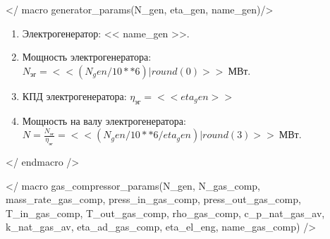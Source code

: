 

</ macro generator_params(N_gen, eta_gen, name_gen)/>
\begin{enumerate}
	\item Электрогенератор: << name_gen >>.
	\item Мощность электрогенератора: $N_{эг} = << (N_gen/10**6)|round(0) >>\ МВт$.
	\item КПД электрогенератора: $\eta_{эг} = << eta_gen >>$
	\item Мощность на валу электрогенератора: $N = \frac{N_{эг}}{\eta_{эг}} = << (N_gen / 10**6 / eta_gen)| round(3) >>\ МВт$.
\end{enumerate}
</ endmacro />


</ macro gas_compressor_params(N_gen, N_gas_comp, mass_rate_gas_comp, press_in_gas_comp, press_out_gas_comp, T_in_gas_comp, T_out_gas_comp, rho_gas_comp, c_p_nat_gas_av, k_nat_gas_av, eta_ad_gas_comp, eta_el_eng, name_gas_comp) />
